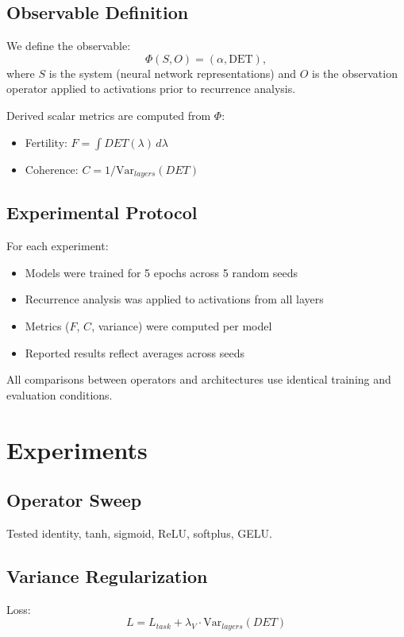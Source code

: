 \documentclass[11pt]{article}
\begin{document}
\subsection{Observable Definition}

We define the observable:
\[
	\Phi(S, O) = (\alpha, \mathrm{DET}),
\]
where $S$ is the system (neural network representations) and $O$ is the observation operator applied to activations prior to recurrence analysis.

Derived scalar metrics are computed from $\Phi$:
\begin{itemize}
	\item Fertility: $F = \int DET(\lambda)\, d\lambda$
	\item Coherence: $C = 1 / \mathrm{Var}_{layers}(DET)$
\end{itemize}

\subsection{Experimental Protocol}

For each experiment:
\begin{itemize}
	\item Models were trained for 5 epochs across 5 random seeds
	\item Recurrence analysis was applied to activations from all layers
	\item Metrics ($F$, $C$, variance) were computed per model
	\item Reported results reflect averages across seeds
\end{itemize}

All comparisons between operators and architectures use identical training and evaluation conditions.

\section{Experiments}

\subsection{Operator Sweep}
Tested identity, tanh, sigmoid, ReLU, softplus, GELU.

\subsection{Variance Regularization}
Loss:
\[
	L = L_{task} + \lambda_V \cdot \mathrm{Var}_{layers}(DET)
\]
\end{document}
